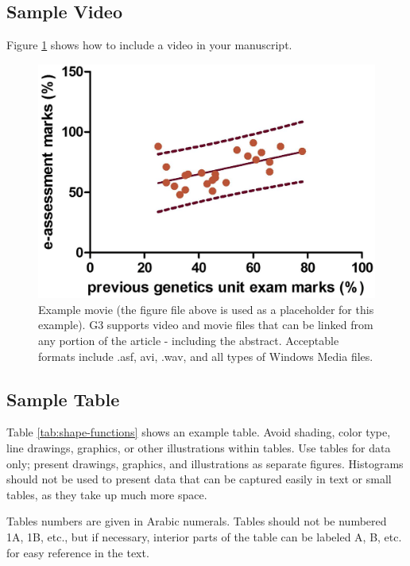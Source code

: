 \documentclass[9pt,twocolumn,twoside]{gsag3jnl}
\begin{document}
\subsection{Sample Video}

Figure \ref{video:spectrum} shows how to include a video in your manuscript.

\begin{figure}[htbp]
\renewcommand{\familydefault}{\sfdefault}\normalfont
\centering
\includegraphics[width=\linewidth]{example-figure-g3}
\caption{Example movie (the figure file above is used as a placeholder for this example). G3 supports video and movie files that can be linked from any portion of the article - including the abstract. Acceptable formats include .asf, avi, .wav, and all types of Windows Media files.   
}%
\label{video:spectrum}
\end{figure}


\subsection{Sample Table}

Table \ref{tab:shape-functions} shows an example table. Avoid shading, color type, line drawings, graphics, or other illustrations within tables. Use tables for data only; present drawings, graphics, and illustrations as separate figures. Histograms should not be used to present data that can be captured easily in text or small tables, as they take up much more space.  

Tables numbers are given in Arabic numerals. Tables should not be numbered 1A, 1B, etc., but if necessary, interior parts of the table can be labeled A, B, etc. for easy reference in the text.  
\end{document}
